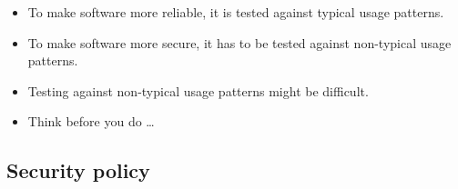 \begin{frame}
  \begin{itemize}
    \item To make software more reliable, it is tested against typical usage 
      patterns.

    \item To make software more secure, it has to be tested against non-typical 
      usage patterns.

    \item Testing against non-typical usage patterns might be difficult.

    \item Think before you do \dots
  \end{itemize}
\end{frame}

\subsection{Security policy}



